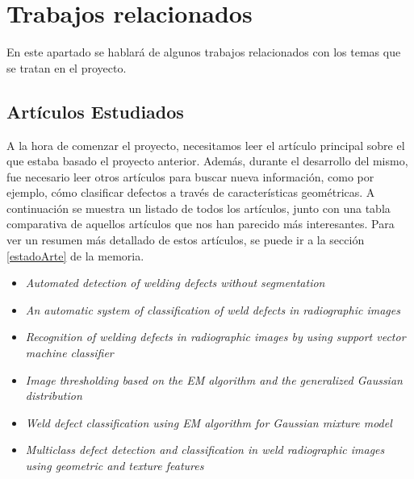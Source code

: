 \chapter{Trabajos relacionados}

En este apartado se hablará de algunos trabajos relacionados con los temas que se tratan en el proyecto.

\section{Artículos Estudiados}
A la hora de comenzar el proyecto, necesitamos leer el artículo principal sobre el que estaba basado el proyecto anterior. Además, durante el desarrollo del mismo, fue necesario leer otros artículos para buscar nueva información, como por ejemplo, cómo clasificar defectos a través de características geométricas. A continuación se muestra un listado de todos los artículos, junto con una tabla comparativa  de aquellos artículos que nos han parecido más interesantes. Para ver un resumen más detallado de estos artículos, se puede ir a la sección \ref{estadoArte} de la memoria. 

\begin{itemize}
		\item\textit{Automated detection of welding defects without segmentation} \cite{DomingoMery}
		\item \textit{An automatic system of classification of weld defects in radiographic images} \cite{vilar2009automatic}
		\item \textit{Recognition of welding defects in radiographic images by using support vector machine classifier} \cite{wang2010recognition}
		\item \textit{Image thresholding based on the EM algorithm and the generalized Gaussian distribution} \cite{bazi2007image}
		\item \textit{Weld defect classification using EM algorithm for Gaussian mixture model} \cite{tridi}
		\item \textit{Multiclass defect detection and classification in weld radiographic images
using geometric and texture features}\cite{Valavanis20107606}
	\end{itemize}


